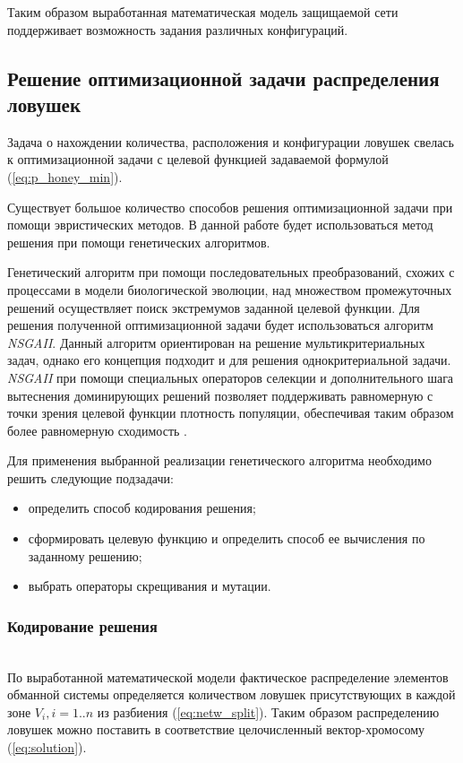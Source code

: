 Таким образом выработанная математическая модель защищаемой сети поддерживает возможность задания различных конфигураций.

\subsection{Решение оптимизационной задачи распределения ловушек}

Задача о нахождении количества, расположения и конфигурации ловушек свелась к оптимизационной задачи с целевой функцией задаваемой формулой (\ref{eq:p_honey_min}).

Существует большое количество способов решения оптимизационной задачи при помощи эвристических методов. В данной работе будет использоваться метод решения при помощи генетических алгоритмов.

Генетический алгоритм при помощи последовательных преобразований, схожих с процессами в модели биологической эволюции, над множеством промежуточных решений осуществляет поиск экстремумов заданной целевой функции. Для решения полученной оптимизационной задачи будет использоваться алгоритм \textit{NSGAII}. Данный алгоритм ориентирован на решение мультикритериальных задач, однако его концепция подходит и для решения однокритериальной задачи. \textit{NSGAII} при помощи специальных операторов селекции и дополнительного шага вытеснения доминирующих решений позволяет поддерживать равномерную с точки зрения целевой функции плотность популяции, обеспечивая таким образом более равномерную сходимость \citep{NSGA2002}.

Для применения выбранной реализации генетического алгоритма необходимо решить следующие подзадачи:
\begin{itemize}
	\item определить способ кодирования решения;
	\item сформировать целевую функцию и определить способ ее вычисления по заданному решению;
	\item выбрать операторы скрещивания и мутации.
\end{itemize}

\subsubsection{Кодирование решения}\hspace*{\fill} \\

По выработанной математической модели фактическое распределение элементов обманной системы определяется количеством ловушек присутствующих в каждой зоне $V_i, i=1..n$ из разбиения (\ref{eq:netw_split}). Таким образом распределению ловушек можно поставить в соответствие целочисленный вектор-хромосому (\ref{eq:solution}).

